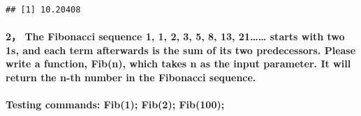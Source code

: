 \documentclass[]{article}
\let\oldparagraph\paragraph
\renewcommand{\paragraph}[1]{\oldparagraph{#1}\mbox{}}
\begin{document}
\begin{verbatim}
## [1] 10.20408
\end{verbatim}

\paragraph{2， The Fibonacci sequence 1, 1, 2, 3, 5, 8, 13,
21\ldots{}\ldots{} starts with two 1s, and each term afterwards is the
sum of its two predecessors. Please write a function, Fib(n), which
takes n as the input parameter. It will return the n-th number in the
Fibonacci
sequence.}\label{the-fibonacci-sequence-1-1-2-3-5-8-13-21-starts-with-two-1s-and-each-term-afterwards-is-the-sum-of-its-two-predecessors.-please-write-a-function-fibn-which-takes-n-as-the-input-parameter.-it-will-return-the-n-th-number-in-the-fibonacci-sequence.}

\paragraph{Testing commands: Fib(1); Fib(2);
Fib(100);}\label{testing-commands-fib1-fib2-fib100}
\end{document}
